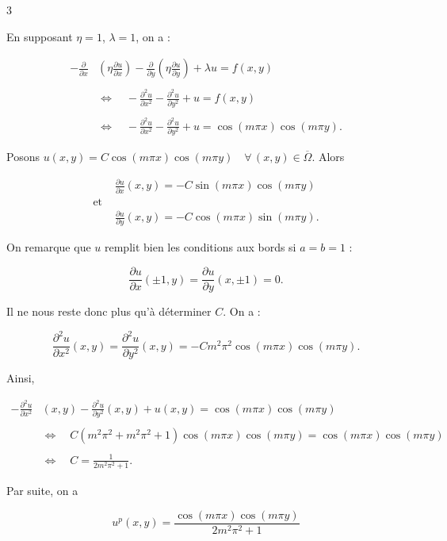 \newpage

\begin{reponse}{3}

En supposant $\eta = 1$, $\lambda = 1$, on a :

\begin{align*}
    -\frac{\partial}{\partial x} & \left( \eta \frac{\partial u}{\partial x}\right) -\frac{\partial}{\partial y} \left( \eta \frac{\partial u}{\partial y}\right) + \lambda u = f(x,y) \\ \\
    & \Longleftrightarrow \quad -\frac{\partial^2u}{\partial x^2}-\frac{\partial^2u}{\partial y^2} + u = f(x,y) \\ \\
    & \Longleftrightarrow \quad  -\frac{\partial^2u}{\partial x^2}-\frac{\partial^2u}{\partial y^2} + u = \cos (m \pi x) \cos (m \pi y).
\end{align*}

Posons $u(x,y) = C \cos (m \pi x) \cos (m \pi y) \quad \forall\, (x,y) \in \overline{\Omega}$. Alors

\begin{align*}
    & \frac{\partial u}{\partial x}(x,y)=-C \sin (m \pi x) \cos (m \pi y) \\ 
    \text{et } \\
    & \frac{\partial u}{\partial y}(x,y)=-C \cos (m \pi x) \sin (m \pi y).
\end{align*}

On remarque que $u$ remplit bien les conditions aux bords si $a=b=1$ :

\[ 
    \frac{\partial u}{\partial x} (\pm 1, y) = \frac{\partial u}{\partial y} (x, \pm 1) = 0.
\]

Il ne nous reste donc plus qu'à déterminer $C$. On a :

\[
    \frac{\partial ^2u}{\partial x^2} (x,y)= \frac{\partial ^2u}{\partial y^2}(x,y) = -Cm^2\pi^2 \cos (m \pi x) \cos (m \pi y).
\]

Ainsi,

\begin{align*}
     -\frac{\partial ^2u}{\partial x^2} & (x,y) - \frac{\partial ^2u}{\partial y^2}(x,y) + u(x,y) = \cos (m \pi x) \cos (m \pi y) \\ \\
    & \Longleftrightarrow \quad C(m^2\pi^2+m^2\pi^2+1) \cos (m \pi x) \cos (m \pi y) = \cos (m \pi x) \cos (m \pi y) \\ \\
    & \Longleftrightarrow \quad C = \frac{1}{2m^2\pi^2 +1}.
\end{align*}

Par suite, on a

\[
    u^p(x,y) = \frac{\cos (m \pi x) \cos (m \pi y)}{2m^2\pi^2 +1}
\]

\end{reponse}

